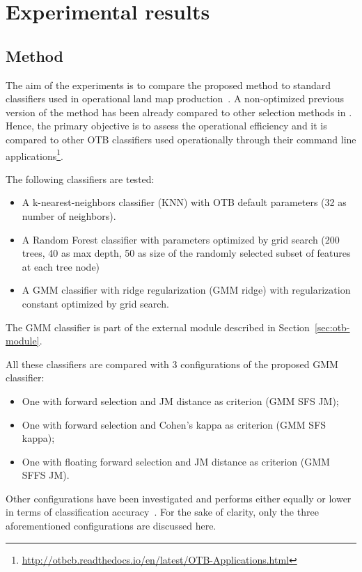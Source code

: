 \documentclass[journal]{IEEEtran}
\begin{document}
\section{Experimental results}
\label{sec:test}

    \subsection{Method}
    \label{sec:method}

    The aim  of the experiments is  to compare the proposed  method to
    standard    classifiers    used    in   operational    land    map
    production~\cite{rs70912356}. A non-optimized  previous version of
    the method has been already compared to other selection methods in
    \cite{fauvel2015fast}.  Hence, the primary  objective is to assess
    the  operational  efficiency  and  it is  compared  to  other  OTB
    classifiers   used  operationally   through  their   command  line
    applications\footnote{\url{http://otbcb.readthedocs.io/en/latest/OTB-Applications.html}}.

    The following classifiers are tested:
    \begin{itemize}
        \item A k-nearest-neighbors classifier (KNN) with OTB default parameters (32 as number of neighbors).
        \item A Random Forest classifier with parameters optimized by grid search (200 trees, 40 as max depth, 50 as size of the randomly selected subset of features at each tree node)
        \item A GMM classifier with ridge regularization (GMM ridge) with regularization constant optimized by grid search.
    \end{itemize}
    The GMM classifier is part of the external module described in Section~\ref{sec:otb-module}.

    All these classifiers are compared with 3 configurations of the proposed GMM classifier:
    \begin{itemize}
    \item One with forward selection and JM distance as criterion (GMM SFS JM);
    \item One with forward selection and Cohen's kappa as criterion (GMM SFS kappa);
    \item One with floating forward selection and JM distance as criterion (GMM SFFS JM).
    \end{itemize}
    Other configurations  have been  investigated and  performs either
    equally     or     lower     in    terms     of     classification
    accuracy~\cite{al:report}. For the sake of clarity, only the three
    aforementioned configurations are discussed here.
\end{document}
